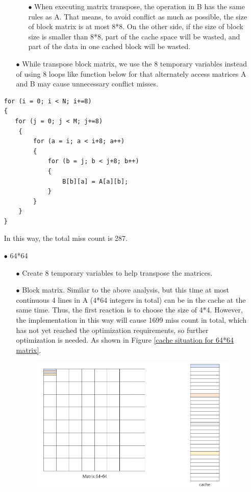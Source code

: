 \documentclass{article}
\begin{document}
\begin{itemize}
\begin{itemize}
\begin{itemize}
\begin{figure}[htbp]
\end{figure}
\item[$\bullet$]When executing matrix transpose, the operation in B has the same rules as A. That means, to avoid conflict as much as possible, the size of block matrix is at most 8*8. On the other side, if the size of block size is smaller than 8*8, part of the cache space will be wasted, and part of the data in one cached block will be wasted.
\end{itemize}
\item[$\bullet$]While transpose block matrix, we use the 8 temporary variables instead of using 8 loops like function below for that alternately access matrices A and B may cause unnecessary conflict misses. 
\end{itemize}
\begin{lstlisting}[language={[ANSI]C}]
for (i = 0; i < N; i+=8)
{
   for (j = 0; j < M; j+=8)
    {
        for (a = i; a < i+8; a++) 
        {
            for (b = j; b < j+8; b++)
            {
                B[b][a] = A[a][b];
            }
        }
    }
}
\end{lstlisting}
In this way,  the total miss count is 287.
\item[$\bullet$]64*64
\begin{itemize}
\item[$\bullet$]Create 8 temporary variables to help transpose the matrices.
\item[$\bullet$]Block matrix. Similar to the above analysis, but this time at most continuous 4 lines in A (4*64 integers in total) can be in the cache at the same time. Thus, the first reaction is to choose the size of 4*4. However, the implementation in this way will cause 1699 miss count in total, which has not yet reached the optimization requirements, so further optimization is needed. As shown in Figure \ref{cache situation for 64*64 matrix}.
\begin{figure}[htbp]
		\centering
		\includegraphics[scale=0.7]{M2}

\end{figure}
\end{itemize}
\end{itemize}
\end{document}
